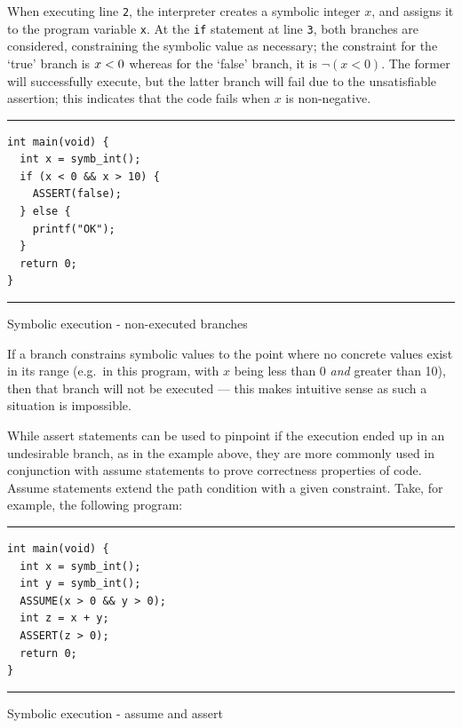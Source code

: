 When executing line \texttt{2}, the interpreter creates a symbolic integer $x$,
and assigns it to the program variable \texttt{x}. At the \texttt{if} statement
at line \texttt{3}, both branches are considered, constraining the symbolic
value as necessary; the constraint for the `true' branch is \texttt{$x < 0$}
whereas for the `false' branch, it is \texttt{$\lnot (x < 0)$}. The former will
successfully execute, but the latter branch will fail due to the unsatisfiable
assertion; this indicates that the code fails when $x$ is non-negative.

\begin{listing}[!ht]
\noindent\rule{\textwidth}{0.5pt}
\vspace{-0.6cm}
\begin{verbatim}
int main(void) {
  int x = symb_int();
  if (x < 0 && x > 10) {
    ASSERT(false);
  } else {
    printf("OK");
  }
  return 0;
}
\end{verbatim}
\vspace{-0.4cm}
\noindent\rule{\textwidth}{0.5pt}
\vspace{-0.6cm}
\caption{Symbolic execution - non-executed branches}
\end{listing}

If a branch constrains symbolic values to the point where no concrete values
exist in its range (e.g.\ in this program, with $x$ being less than 0
\textit{and} greater than 10), then that branch will not be executed --- this
makes intuitive sense as such a situation is impossible.

While assert statements can be used to pinpoint if the execution ended up in an
undesirable branch, as in the example above, they are more commonly used in
conjunction with assume statements to prove correctness properties of code.
Assume statements extend the path condition with a given constraint. Take, for
example, the following program:

\begin{listing}[!ht]
\noindent\rule{\textwidth}{0.5pt}
\vspace{-0.6cm}
\begin{verbatim}
int main(void) {
  int x = symb_int();
  int y = symb_int();
  ASSUME(x > 0 && y > 0);
  int z = x + y;
  ASSERT(z > 0);
  return 0;
}
\end{verbatim}
\vspace{-0.4cm}
\noindent\rule{\textwidth}{0.5pt}
\vspace{-0.6cm}
\caption{Symbolic execution - assume and assert}
\end{listing}


